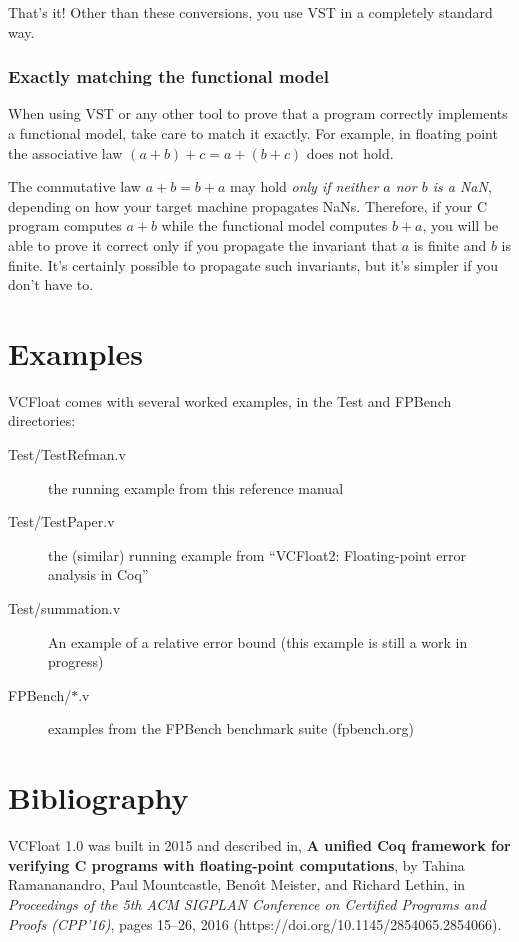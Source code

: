 \documentclass[article]{memoir}
\begin{document}
That's it!  Other than these conversions, you use VST in
a completely standard way.  

\subsection*{Exactly matching the functional model}

When using VST or any other tool to prove that a program correctly
implements a functional model, take care to
match it exactly.  For example, in floating point the
associative law $(a+b)+c=a+(b+c)$ does not hold.

The commutative law $a+b=b+a$ may hold \emph{only if
neither $a$ nor $b$ is a NaN}, depending on how your target
machine propagates NaNs.  Therefore, if your C program
computes $a+b$ while the functional model computes $b+a$,
you will be able to prove it correct only if you propagate
the invariant that $a$ is finite and $b$ is finite.
It's certainly possible to propagate such invariants, but
it's simpler if you don't have to.

\chapter{Examples}

VCFloat comes with several worked examples, in the Test and FPBench directories:
\begin{description}
\item[Test/TestRefman.v]  the running example from this reference manual
\item[Test/TestPaper.v]  the (similar) running example from ``VCFloat2: Floating-point error analysis in Coq''
\item[Test/summation.v]  An example of a relative error bound (this example is still a work in progress)
\item[FPBench/$*$.v]  examples from the FPBench benchmark suite (fpbench.org)
\end{description}

\chapter{Bibliography}

\quad VCFloat 1.0 was built in 2015 and described in,\newline
\textbf{A unified Coq framework for verifying C programs with floating-point computations}, by Tahina Ramananandro, Paul Mountcastle, Beno\^{\i}t  Meister, and Richard Lethin, in \emph{Proceedings of the 5th ACM SIGPLAN Conference on Certified Programs and Proofs (CPP'16)}, pages 15--26, 2016 (https://doi.org/10.1145/2854065.2854066).
\vspace\baselineskip
\end{document}
